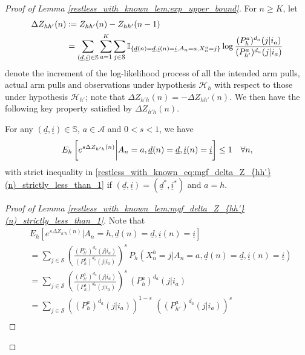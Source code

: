 \begin{proof}[Proof of Lemma \ref{restless_with_known_lem:exp_upper_bound}]
For $n\geq K$, let
\begin{align}
	\Delta Z_{hh'}(n)&\coloneqq Z_{hh'}(n)-Z_{hh'}(n-1)\nonumber\\
					 &=\sum\limits_{(\underline{d},\underline{i})\in\mathbb{S}}\sum\limits_{a=1}^{K}\sum\limits_{j\in\mathcal{S}}\mathbb{I}_{\{\underline{d}(n)=\underline{d},\underline{i}(n)=\underline{i},A_n=a,X^a_n=j\}}\log\frac{(P_h^a)^{d_a}(j|i_a)}{(P_{h'}^a)^{d_a}(j|i_a)}\label{restless_with_known_eq:delta_Z_{hh'}(n)}
\end{align}
denote the increment of the log-likelihood process of all the intended arm pulls, actual arm pulls and observations under hypothesis $\mathcal{H}_h$ with respect to those under hypothesis $\mathcal{H}_{h'}$;
 note that $\Delta Z_{h'h}(n)=-\Delta Z_{hh'}(n)$. We then have the following key property satisfied by $\Delta Z_{h'h}(n)$.
 \begin{lemma}\label{restless_with_known_lem:mgf_delta_Z_{hh'}(n)_strictly_less_than_1}
 	For any $(\underline{d},\underline{i})\in \mathbb{S}$, $a\in\mathcal{A}$ and $0<s<1$, we have
 	\begin{equation}
 		E_h\left[e^{s\Delta Z_{h'h}(n)}\bigg|A_n=a,\underline{d}(n)=\underline{d},\underline{i}(n)=\underline{i}\right]\leq 1\quad \forall n,\label{restless_with_known_eq:mgf_delta_Z_{hh'}(n)_strictly_less_than_1} 
  	\end{equation}
 	with strict inequality in \eqref{restless_with_known_eq:mgf_delta_Z_{hh'}(n)_strictly_less_than_1} if $(\underline{d},\underline{i})=(\underline{d}^*,\underline{i}^*)$ and $a=h$.
 \end{lemma}
 \begin{proof}[Proof of Lemma \ref{restless_with_known_lem:mgf_delta_Z_{hh'}(n)_strictly_less_than_1}]
 Note that
 \begingroup\allowdisplaybreaks\begin{align}
 	&E_h\left[e^{s\Delta Z_{h'h}(n)}\bigg|A_n=h,\underline{d}(n)=\underline{d},\underline{i}(n)=\underline{i}\right]\nonumber\\
	&=\sum\limits_{j\in\mathcal{S}} \left(\frac{(P_{h'}^a)^{d_a}(j|i_a)}{(P_h^a)^{d_a}(j|i_a)}\right)^s\,P_h(X_n^h=j|A_n=a,\underline{d}(n)=\underline{d},\underline{i}(n)=\underline{i})\nonumber\\
 	&=\sum\limits_{j\in\mathcal{S}} \left(\frac{(P_{h'}^a)^{d_a}(j|i_a)}{(P_h^a)^{d_a}(j|i_a)}\right)^s\,(P_h^a)^{d_a}(j|i_a)\nonumber\\
 	&=\sum\limits_{j\in\mathcal{S}} ((P_h^a)^{d_a}(j|i_a))^{1-s}\,\,((P_{h'}^a)^{d_a}(j|i_a))^s\nonumber\\

\end{align}
\end{proof}
\end{proof}
